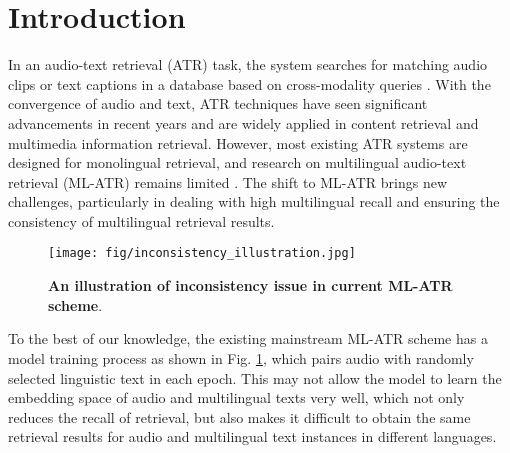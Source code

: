 \section{Introduction}
In an audio-text retrieval (ATR) task, the system searches for matching audio clips or text captions in a database based on cross-modality queries \cite{zhu2024cacophony,zhuang2024kdpror}. With the convergence of audio and text, ATR techniques have seen significant advancements in recent years and are widely applied in content retrieval and multimedia information retrieval. However, most existing ATR systems are designed for monolingual retrieval, and research on multilingual audio-text retrieval (ML-ATR) remains limited \cite{yan2024bridging}. The shift to ML-ATR brings new challenges, particularly in dealing with high multilingual recall and ensuring the consistency \cite{nie2024improving} of multilingual retrieval results.

\begin{figure}[htbp]
    \centering
    \texttt{[image: fig/inconsistency\_illustration.jpg]}
    \caption{\textbf{An illustration of inconsistency issue in current ML-ATR scheme}.}
    \label{Fig:inconsistency illustration}
\end{figure}

To the best of our knowledge, the existing mainstream ML-ATR scheme has a model training process as shown in Fig. \ref{Fig:inconsistency illustration}, which pairs audio with randomly selected linguistic text in each epoch. This may not allow the model to learn the embedding space of audio and multilingual texts very well, which not only reduces the recall of retrieval, but also makes it difficult to obtain the same retrieval results for audio and multilingual text instances in different languages.


